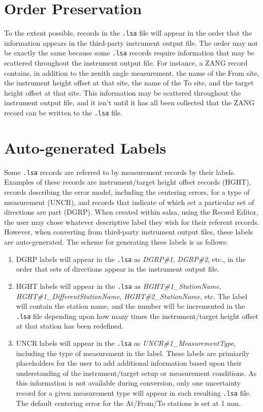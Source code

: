 \section*{Order Preservation}
To the extent possible, records in the \verb+.lsa+ file will appear in the order that the information appears in the third-party instrument output file.  The order may not be exactly the same because some \verb+.lsa+ records require information that may be scattered throughout the instrument output file.  For instance, a ZANG record contains, in addition to the zenith angle measurement, the name of the From site, the instrument height offset at that site, the name of the To site, and the target height offset at that site.  This information may be scattered throughout the instrument output file, and it isn't until it has all been collected that the ZANG record can be written to the \verb+.lsa+ file.

\section*{Auto-generated Labels}
Some \verb+.lsa+ records are referred to by measurement records by their labels.  Examples of these records are instrument/target height offset records (HGHT), records describing the error model, including the centering errors, for a type of measurement (UNCR), and records that indicate of which set a particular set of directions are part (DGRP).  When created within \textsf{salsa}, using the Record Editor, the user may chose whatever descriptive label they wish for their referent records.  However, when converting from third-party instrument output files, these labels are auto-generated.  The scheme for generating these labels is as follows:

\begin{enumerate}
\item DGRP labels will appear in the \verb+.lsa+ as \emph{DGRP\#1}, \emph{DGRP\#2}, etc., in the order that sets of directions appear in the instrument output file.
\item HGHT labels will appear in the \verb+.lsa+ as \emph{HGHT\#1\_StationName},\\ \emph{HGHT\#1\_DifferentStationName}, \emph{HGHT\#2\_StationName}, etc.  The label will contain the station name, and the number will be incremented in the \verb+.lsa+ file depending upon how many times the instrument/target height offset at that station has been redefined.
\item UNCR labels will appear in the \verb+.lsa+ as \emph{UNCR\#1\_MeasurementType}, including the type of measurement in the label.  These labels are primiarily placeholders for the user to add additional information based upon their understanding of the instrument/target setup or measurement conditions.  As this information is not available during conversion, only one uncertainty record for a given measurement type will appear in each resulting \verb+.lsa+ file.  The default centering error for the At/From/To stations is set at 1 mm.
\end{enumerate}


